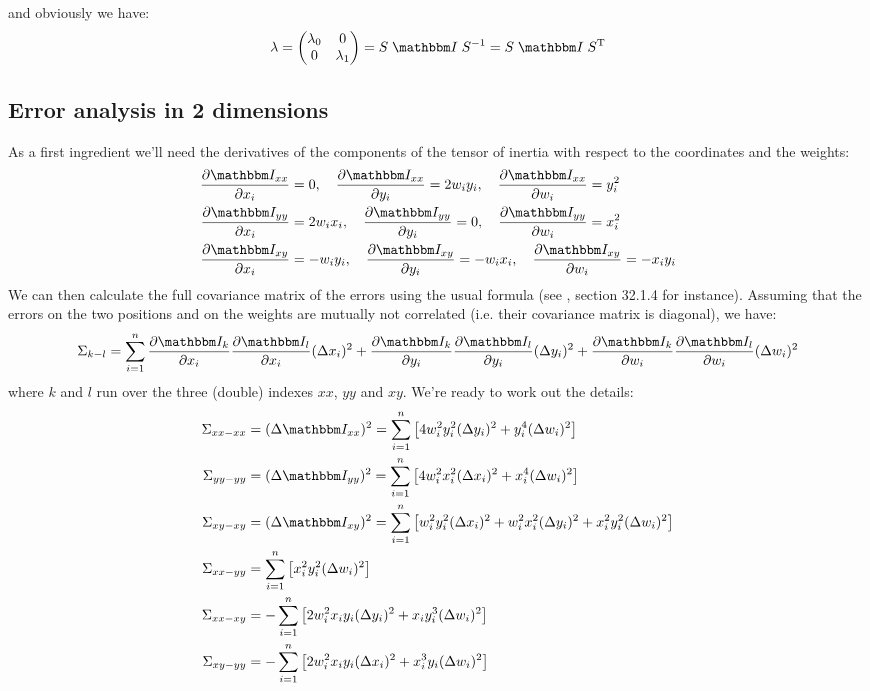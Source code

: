 \documentclass[a4paper,11pt]{article}
\newcommand{\pder}[2]{\frac{\partial#1}{\partial#2}}
\newcommand{\itm}{\mathbbm I}
\newcommand{\itc}[1]{\itm_{#1}}
\begin{document}
and obviously we have:
\begin{equation}\label{eq:rotation}
  \lambda = 
  \begin{pmatrix}
    \lambda_0 & 0\\
    0 & \lambda_1
  \end{pmatrix} = S\;\itm\;S^{-1} = S\;\itm\;S^{\rm T}
\end{equation}


\subsection{Error analysis in 2 dimensions}

As a first ingredient we'll need the derivatives of the components of the
tensor of inertia with respect to the coordinates and the weights:
\begin{align}
\pder{\itc{xx}}{x_i} &= 0,\quad
\pder{\itc{xx}}{y_i}  = 2w_iy_i,\quad
\pder{\itc{xx}}{w_i}  = y_i^2\\
\pder{\itc{yy}}{x_i} &= 2w_ix_i,\quad
\pder{\itc{yy}}{y_i}  = 0,\quad
\pder{\itc{yy}}{w_i}  = x_i^2\\
\pder{\itc{xy}}{x_i} &= -w_iy_i,\quad
\pder{\itc{xy}}{y_i}  = -w_ix_i,\quad
\pder{\itc{xy}}{w_i}  = -x_iy_i
\end{align}
We can then calculate the full covariance matrix of the errors using the
usual formula (see \cite{pdg}, section 32.1.4 for instance). Assuming that
the errors on the two positions and on the weights are mutually not correlated
(i.e. their covariance matrix is diagonal), we have:
\begin{equation}
  \Sigma_{k-l} = \sum_{i=1}^n 
  \pder{\itc{k}}{x_i}\pder{\itc{l}}{x_i}(\Delta x_i)^2 +
  \pder{\itc{k}}{y_i}\pder{\itc{l}}{y_i}(\Delta y_i)^2 +
  \pder{\itc{k}}{w_i}\pder{\itc{l}}{w_i}(\Delta w_i)^2
\end{equation}
where $k$ and $l$ run over the three (double) indexes $xx$, $yy$ and $xy$.
We're ready to work out the details:
\begin{align}
  \Sigma_{xx-xx} &= (\Delta\itc{xx})^2 =
  \sum_{i=1}^n \left[4w^2_iy^2_i(\Delta y_i)^2 + y_i^4(\Delta w_i)^2\right]\\
  \Sigma_{yy-yy} &= (\Delta\itc{yy})^2 =
  \sum_{i=1}^n \left[4w^2_ix^2_i(\Delta x_i)^2 + x_i^4(\Delta w_i)^2\right]\\
  \Sigma_{xy-xy} &= (\Delta\itc{xy})^2 =
  \sum_{i=1}^n \left[w_i^2y_i^2(\Delta x_i)^2 + w_i^2x_i^2(\Delta y_i)^2 +
    x_i^2y_i^2(\Delta w_i)^2 \right]\\
  \Sigma_{xx-yy} &= 
  \sum_{i=1}^n \left[ x_i^2y_i^2 (\Delta w_i)^2\right]\\
  \Sigma_{xx-xy} &= 
  -\sum_{i=1}^n \left[ 2w_i^2x_iy_i(\Delta y_i)^2 +
    x_iy_i^3(\Delta w_i)^2 \right]\\
  \Sigma_{xy-yy} &= 
  -\sum_{i=1}^n \left[ 2w_i^2x_iy_i(\Delta x_i)^2 +
    x_i^3y_i(\Delta w_i)^2 \right]
\end{align}
\end{document}
